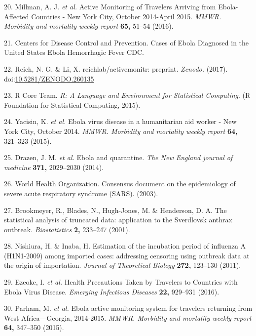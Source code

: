 \documentclass[]{article}
\begin{document}
\hypertarget{ref-Millman:2016cz}{}
20. Millman, A. J. \emph{et al.} Active Monitoring of Travelers Arriving
from Ebola-Affected Countries - New York City, October 2014-April 2015.
\emph{MMWR. Morbidity and mortality weekly report} \textbf{65,} 51--54
(2016).

\hypertarget{ref-CentersforDiseaseControlandPrevention:VbDBWqNH}{}
21. Centers for Disease Control and Prevention. Cases of Ebola Diagnosed
in the United States \textbar{} Ebola Hemorrhagic Fever \textbar{} CDC.

\hypertarget{ref-Reich:2017z}{}
22. Reich, N. G. \& Li, X. reichlab/activemonitr: preprint.
\emph{Zenodo.} (2017).
doi:\href{https://doi.org/10.5281/ZENODO.260135}{10.5281/ZENODO.260135}

\hypertarget{ref-rcoreteam}{}
23. R Core Team. \emph{R: A Language and Environment for Statistical
Computing}. (R Foundation for Statistical Computing, 2015).

\hypertarget{ref-Yacisin:2015wm}{}
24. Yacisin, K. \emph{et al.} Ebola virus disease in a humanitarian aid
worker - New York City, October 2014. \emph{MMWR. Morbidity and
mortality weekly report} \textbf{64,} 321--323 (2015).

\hypertarget{ref-Drazen:2014iz}{}
25. Drazen, J. M. \emph{et al.} Ebola and quarantine. \emph{The New
England journal of medicine} \textbf{371,} 2029--2030 (2014).

\hypertarget{ref-WorldHealthOrganization:QuWKXo2f}{}
26. World Health Organization. Consensus document on the epidemiology of
severe acute respiratory syndrome (SARS). (2003).

\hypertarget{ref-Brookmeyer:2001gx}{}
27. Brookmeyer, R., Blades, N., Hugh-Jones, M. \& Henderson, D. A. The
statistical analysis of truncated data: application to the Sverdlovsk
anthrax outbreak. \emph{Biostatistics} \textbf{2,} 233--247 (2001).

\hypertarget{ref-Nishiura:2011dc}{}
28. Nishiura, H. \& Inaba, H. Estimation of the incubation period of
influenza A (H1N1-2009) among imported cases: addressing censoring using
outbreak data at the origin of importation. \emph{Journal of Theoretical
Biology} \textbf{272,} 123--130 (2011).

\hypertarget{ref-Ezeoke:2016jv}{}
29. Ezeoke, I. \emph{et al.} Health Precautions Taken by Travelers to
Countries with Ebola Virus Disease. \emph{Emerging Infectious Diseases}
\textbf{22,} 929--931 (2016).

\hypertarget{ref-Parham:2015wf}{}
30. Parham, M. \emph{et al.} Ebola active monitoring system for
travelers returning from West Africa---Georgia, 2014-2015. \emph{MMWR.
Morbidity and mortality weekly report} \textbf{64,} 347--350 (2015).
\end{document}
